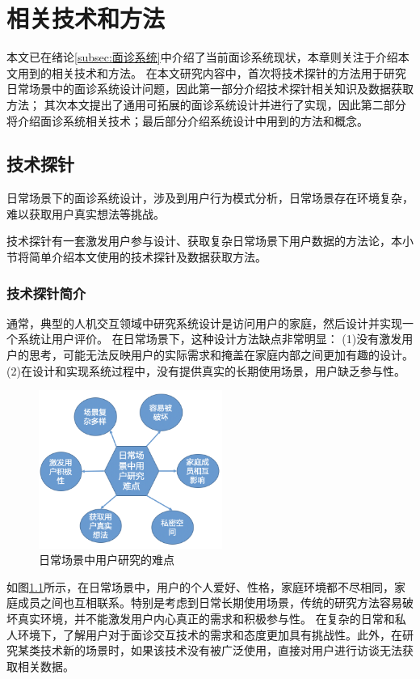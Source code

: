 \chapter{相关技术和方法}
本文已在绪论\ref{subsec:面诊系统}中介绍了当前面诊系统现状，本章则关注于介绍本文用到的相关技术和方法。
在本文研究内容中，首次将技术探针的方法用于研究日常场景中的面诊系统设计问题，因此第一部分介绍技术探针相关知识及数据获取方法；
其次本文提出了通用可拓展的面诊系统设计并进行了实现，因此第二部分将介绍面诊系统相关技术；最后部分介绍系统设计中用到的方法和概念。

\section{技术探针}
日常场景下的面诊系统设计，涉及到用户行为模式分析，日常场景存在环境复杂，难以获取用户真实想法等挑战。

技术探针有一套激发用户参与设计、获取复杂日常场景下用户数据的方法论，本小节将简单介绍本文使用的技术探针及数据获取方法。

\subsection{技术探针简介}

通常，典型的人机交互领域中研究系统设计是访问用户的家庭，然后设计并实现一个系统让用户评价。
在日常场景下，这种设计方法缺点非常明显\cite{Hutchinson2003Technology}：
(1)没有激发用户的思考，可能无法反映用户的实际需求和掩盖在家庭内部之间更加有趣的设计。
(2)在设计和实现系统过程中，没有提供真实的长期使用场景，用户缺乏参与性。

\begin{figure}[h]
    \centering
    \includegraphics[width=6cm]{images/user_study_hard.png}
    \caption{日常场景中用户研究的难点}
    \label{fig:user_study_hard}
\end{figure}

如图\ref{fig:user_study_hard}所示，在日常场景中，用户的个人爱好、性格，家庭环境都不尽相同，家庭成员之间也互相联系。特别是考虑到日常长期使用场景，传统的研究方法容易破坏真实环境，并不能激发用户内心真正的需求和积极参与性。
在复杂的日常和私人环境下，了解用户对于面诊交互技术的需求和态度更加具有挑战性。此外，在研究某类技术新的场景时，如果该技术没有被广泛使用，直接对用户进行访谈无法获取相关数据。

